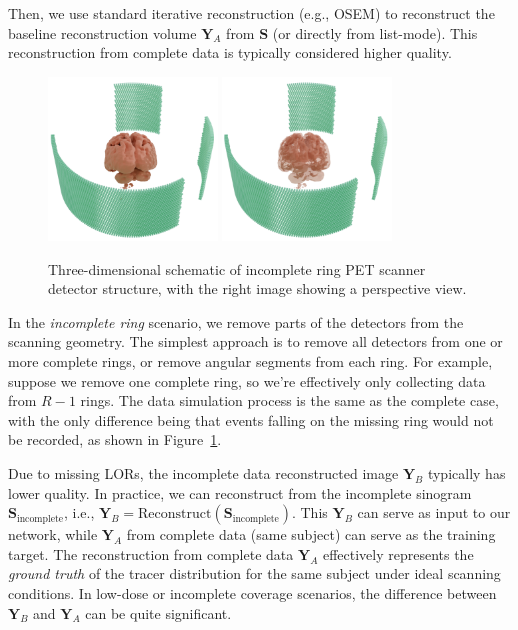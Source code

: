 \documentclass[
reprint,
superscriptaddress,
nofootinbib,
amsmath,amssymb,
aps,
prd,
]{revtex4-2}
\begin{document}
Then, we use standard iterative reconstruction (e.g., OSEM) to reconstruct the baseline reconstruction volume \(\mathbf{Y}_A\) from \(\mathbf{S}\) (or directly from list-mode). This reconstruction from complete data is typically considered higher quality.
\begin{figure}[htbp]
    \centering
    \vspace{-0.2cm}
    \includegraphics[width=0.4\textwidth]{Images/Thehumanbrainismissing5}
    \includegraphics[width=0.4\textwidth]{Images/Thehumanbrainismissing4}
    \vspace{-0.2cm}
    \caption{Three-dimensional schematic of incomplete ring PET scanner detector structure, with the right image showing a perspective view.}
    \vspace{-0.2cm}
    \label{fig:pet_structures2}
\end{figure}
In the \emph{incomplete ring} scenario, we remove parts of the detectors from the scanning geometry. The simplest approach is to remove all detectors from one or more complete rings, or remove angular segments from each ring. For example, suppose we remove one complete ring, so we're effectively only collecting data from \(R-1\) rings. The data simulation process is the same as the complete case, with the only difference being that events falling on the missing ring would not be recorded, as shown in Figure~\ref{fig:pet_structures2}.

Due to missing LORs, the incomplete data reconstructed image \(\mathbf{Y}_B\) typically has lower quality. In practice, we can reconstruct from the incomplete sinogram \(\mathbf{S}_{\text{incomplete}}\), i.e., \(\mathbf{Y}_B = \text{Reconstruct}(\mathbf{S}_{\text{incomplete}})\). This \(\mathbf{Y}_B\) can serve as input to our network, while \(\mathbf{Y}_A\) from complete data (same subject) can serve as the training target. The reconstruction from complete data \(\mathbf{Y}_A\) effectively represents the \emph{ground truth} of the tracer distribution for the same subject under ideal scanning conditions. In low-dose or incomplete coverage scenarios, the difference between \(\mathbf{Y}_B\) and \(\mathbf{Y}_A\) can be quite significant.
\end{document}
